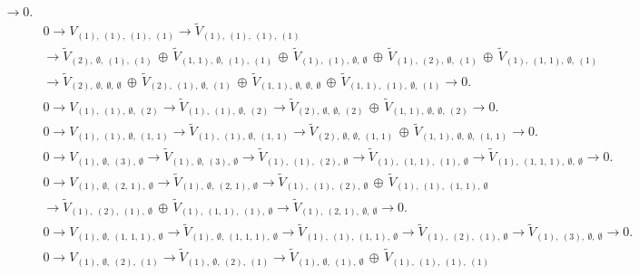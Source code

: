 \documentclass[openany, a4paper]{amsbook}
\theoremstyle{definition}
\numberwithin{equation}{chapter}
\begin{document}
\begin{align*}
\to 0.
\\ &
0 \to 
V_{ (1), \ (1), \ (1), \ (1) }\to
\tilde{V}_{ (1), \ (1), \ (1), \ (1) } \\ &
\to
\tilde{V}_{ (2), \ \emptyset, \ (1), \ (1) }\,\oplus\,\tilde{V}_{ (1,\,1), \ \emptyset, \ (1), \ (1) }\,\oplus\,\tilde{V}_{ (1), \ (1), \ \emptyset, \ \emptyset }\,\oplus\,\tilde{V}_{ (1), \ (2), \ \emptyset, \ (1) }\,\oplus\,\tilde{V}_{ (1), \ (1,\,1), \ \emptyset, \ (1) } \\ &
\to 
\tilde{V}_{ (2), \ \emptyset, \ \emptyset, \ \emptyset }\,\oplus\,\tilde{V}_{ (2), \ (1), \ \emptyset, \ (1) }\,\oplus\,\tilde{V}_{ (1,\,1), \ \emptyset, \ \emptyset, \ \emptyset }\,\oplus\,\tilde{V}_{ (1,\,1), \ (1), \ \emptyset, \ (1) } 
\to 0.
\\ &
0 \to 
V_{ (1), \ (1), \ \emptyset, \ (2) }\to
\tilde{V}_{ (1), \ (1), \ \emptyset, \ (2) }
\to
\tilde{V}_{ (2), \ \emptyset, \ \emptyset, \ (2) }\,\oplus\,\tilde{V}_{ (1,\,1), \ \emptyset, \ \emptyset, \ (2) }
\to 0.
\\ &
0 \to 
V_{ (1), \ (1), \ \emptyset, \ (1,\,1) }\to
\tilde{V}_{ (1), \ (1), \ \emptyset, \ (1,\,1) }
\to
\tilde{V}_{ (2), \ \emptyset, \ \emptyset, \ (1,\,1) }\,\oplus\,\tilde{V}_{ (1,\,1), \ \emptyset, \ \emptyset, \ (1,\,1) }
\to 0.
\\ &
0 \to 
V_{ (1), \ \emptyset, \ (3), \ \emptyset }\to
\tilde{V}_{ (1), \ \emptyset, \ (3), \ \emptyset }
\to
\tilde{V}_{ (1), \ (1), \ (2), \ \emptyset } 
\to
\tilde{V}_{ (1), \ (1,\,1), \ (1), \ \emptyset } 
\to
\tilde{V}_{ (1), \ (1,\,1,\,1), \ \emptyset, \ \emptyset }
\to 0.
\\ &
0 \to 
V_{ (1), \ \emptyset, \ (2,\,1), \ \emptyset }\to
\tilde{V}_{ (1), \ \emptyset, \ (2,\,1), \ \emptyset }
\to
\tilde{V}_{ (1), \ (1), \ (2), \ \emptyset }\,\oplus\,\tilde{V}_{ (1), \ (1), \ (1,\,1), \ \emptyset } \\ &
\to
\tilde{V}_{ (1), \ (2), \ (1), \ \emptyset }\,\oplus\,\tilde{V}_{ (1), \ (1,\,1), \ (1), \ \emptyset }
\to
\tilde{V}_{ (1), \ (2,\,1), \ \emptyset, \ \emptyset }
\to 0.
\\ &
0 \to 
V_{ (1), \ \emptyset, \ (1,\,1,\,1), \ \emptyset }\to
\tilde{V}_{ (1), \ \emptyset, \ (1,\,1,\,1), \ \emptyset }
\to
\tilde{V}_{ (1), \ (1), \ (1,\,1), \ \emptyset }
\to
\tilde{V}_{ (1), \ (2), \ (1), \ \emptyset }
\to
\tilde{V}_{ (1), \ (3), \ \emptyset, \ \emptyset }
\to 0.
\\ &
0 \to 
V_{ (1), \ \emptyset, \ (2), \ (1) }\to
\tilde{V}_{ (1), \ \emptyset, \ (2), \ (1) }
\to
\tilde{V}_{ (1), \ \emptyset, \ (1), \ \emptyset }\,\oplus\,\tilde{V}_{ (1), \ (1), \ (1), \ (1) } \\ &

\end{align*}
\end{document}
